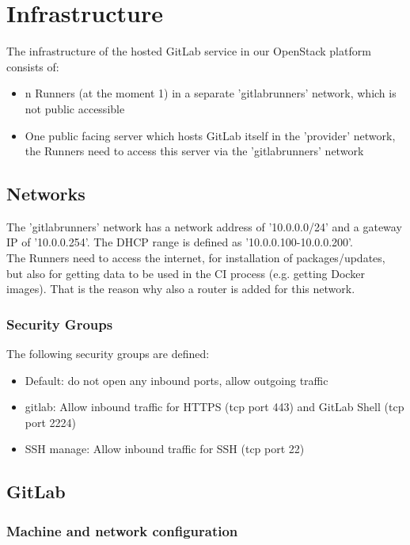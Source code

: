 \chapter{Infrastructure}

The infrastructure of the hosted GitLab service in our OpenStack platform consists of:
\begin{itemize}
    \item n Runners (at the moment 1) in a separate 'gitlabrunners' network, which is not public accessible
    \item One public facing server which hosts GitLab itself in the 'provider' network,
          the Runners need to access this server via the 'gitlabrunners' network
\end{itemize}

\section{Networks}

The 'gitlabrunners' network has a network address of '10.0.0.0/24' and a gateway IP of '10.0.0.254'.
The DHCP range is defined as '10.0.0.100-10.0.0.200'.\\

The Runners need to access the internet, for installation of packages/updates, but also for getting data to be used in the CI process (e.g. getting Docker images). 
That is the reason why also a router is added for this network.

\subsection{Security Groups}

The following security groups are defined:
\begin{itemize}
    \item Default: do not open any inbound ports, allow outgoing traffic
    \item gitlab: Allow inbound traffic for HTTPS (tcp port 443) and GitLab Shell (tcp port 2224)
	\item SSH manage: Allow inbound traffic for SSH (tcp port 22)
\end{itemize}

\section{GitLab}

\subsection{Machine and network configuration}

